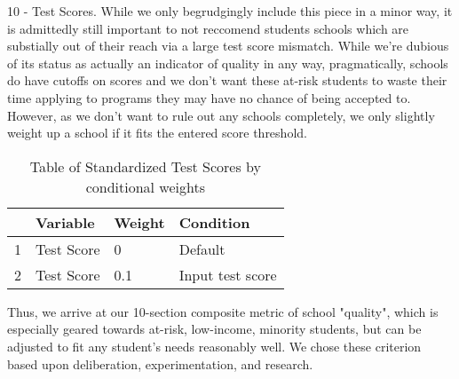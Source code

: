 \documentclass{article}\usepackage[]{graphicx}\usepackage[]{color}
\begin{document}
10 - Test Scores. While we only begrudgingly include this piece in a minor way, it is admittedly still important to not reccomend students schools which are substially out of their reach via a large test score mismatch. While we're dubious of its status as actually an indicator of quality in any way, pragmatically, schools do have cutoffs on scores and we don't want these at-risk students to waste their time applying to programs they may have no chance of being accepted to. However, as we don't want to rule out any schools completely, we only slightly weight up a school if it fits the entered score threshold.

\begin{table}[ht]
\centering
\begin{tabular}{rlll}
  \hline
 & Variable & Weight & Condition \\ 
  \hline
1 & Test Score & 0 & Default \\ 
  2 & Test Score & 0.1 & Input test score \\ 
   \hline
\end{tabular}
\caption{Table of Standardized Test Scores by conditional weights} 
\end{table}


Thus, we arrive at our 10-section composite metric of school "quality", which is especially geared towards at-risk, low-income, minority students, but can be adjusted to fit any student's needs reasonably well. We chose these criterion based upon deliberation, experimentation, and research. 
\end{document}
